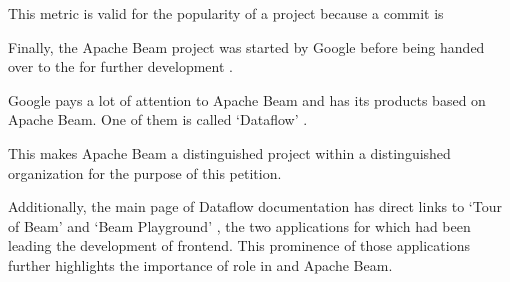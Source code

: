 This metric is valid for the popularity of a project because a commit is


Finally, the Apache Beam project was started by Google before being handed over
to the \Asf for further development .

Google pays a lot of attention to Apache Beam and has its products based on Apache Beam.
One of them is called `Dataflow' .

This makes Apache Beam a distinguished project within a distinguished organization
for the purpose of this petition.

Additionally, the main page of Dataflow documentation has direct links
to `Tour of Beam' and `Beam Playground' , the two applications for which \mrl
had been leading the development of frontend.
This prominence of those applications further highlights
the importance of \mrls role in \Asf and Apache Beam.
